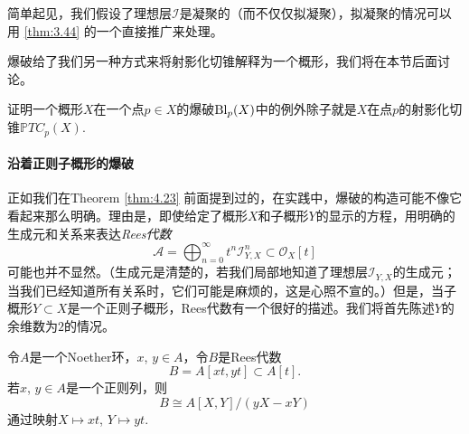 简单起见，我们假设了理想层$\mathscr I$是凝聚的（而不仅仅拟凝聚），拟凝聚的情况可以用 \ref{thm:3.44} 的一个直接推广来处理。

爆破给了我们另一种方式来将射影化切锥解释为一个概形，我们将在本节后面讨论。

\begin{exe}\label{exe:4.24}
	证明一个概形$X$在一个点$p\in X$的爆破$\operatorname{Bl}_p(X)$中的例外除子就是$X$在点$p$的射影化切锥$\mathbb PTC_p(X)$.
\end{exe}

\paragraph*{沿着正则子概形的爆破} 正如我们在Theorem \ref{thm:4.23} 前面提到过的，在实践中，爆破的构造可能不像它看起来那么明确。理由是，即使给定了概形$X$和子概形$Y$的显示的方程，用明确的生成元和关系来表达\textit{Rees代数}
\[
	\mathscr A=\bigoplus_{n=0}^\infty t^n\mathscr I_{Y,X}^n\subset \mathscr O_X[t]
\]
可能也并不显然。（生成元是清楚的，若我们局部地知道了理想层$\mathscr I_{Y,X}$的生成元；当我们已经知道所有关系时，它们可能是麻烦的，这是心照不宣的。）但是，当子概形$Y\subset X$是一个正则子概形，Rees代数有一个很好的描述。我们将首先陈述$Y$的余维数为$2$的情况。


\begin{pro}\label{pro:4.25}
令$A$是一个Noether环，$x$, $y\in A$，令$B$是Rees代数
	\[
		B=A[xt,yt]\subset A[t].
	\]
若$x$, $y\in A$是一个正则列，则
	\[
		B\cong A[X,Y]/(yX-xY)
	\]
通过映射$X\mapsto xt$, $Y\mapsto yt$.
\end{pro}

